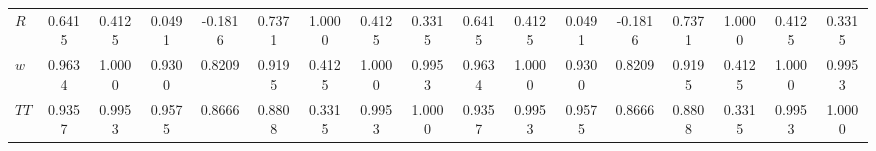 \begin{center}
\begin{longtable}{lcccccccccccccccc}
$R         $	 & 	    0.6415	 & 	    0.4125	 & 	    0.0491	 & 	   -0.1816	 & 	    0.7371	 & 	    1.0000	 & 	    0.4125	 & 	    0.3315	 & 	    0.6415	 & 	    0.4125	 & 	    0.0491	 & 	   -0.1816	 & 	    0.7371	 & 	    1.0000	 & 	    0.4125	 & 	    0.3315 \\ 
$w         $	 & 	    0.9634	 & 	    1.0000	 & 	    0.9300	 & 	    0.8209	 & 	    0.9195	 & 	    0.4125	 & 	    1.0000	 & 	    0.9953	 & 	    0.9634	 & 	    1.0000	 & 	    0.9300	 & 	    0.8209	 & 	    0.9195	 & 	    0.4125	 & 	    1.0000	 & 	    0.9953 \\ 
$TT        $	 & 	    0.9357	 & 	    0.9953	 & 	    0.9575	 & 	    0.8666	 & 	    0.8808	 & 	    0.3315	 & 	    0.9953	 & 	    1.0000	 & 	    0.9357	 & 	    0.9953	 & 	    0.9575	 & 	    0.8666	 & 	    0.8808	 & 	    0.3315	 & 	    0.9953	 & 	    1.0000 \\ 
\end{longtable}
 \end{center}
